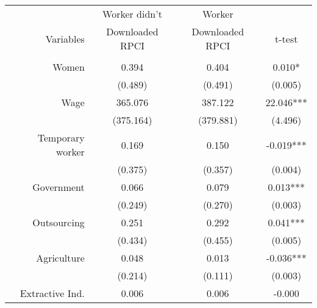 \begin{tabular}{r|rrr}
\toprule
\toprule
\multicolumn{1}{p{12.085em}|}{} & \multicolumn{1}{c}{Worker didn't} & \multicolumn{1}{c}{Worker} &  \\
\multicolumn{1}{p{12.085em}|}{Variables} & \multicolumn{1}{c}{Downloaded RPCI} & \multicolumn{1}{c}{Downloaded RPCI} & \multicolumn{1}{c}{t-test} \\
\midrule
\multicolumn{1}{p{12.085em}|}{} &                 &                 &  \\
\multicolumn{1}{p{12.085em}|}{Women} & \multicolumn{1}{c}{0.394} & \multicolumn{1}{c}{0.404} & \multicolumn{1}{c}{0.010*} \\
\multicolumn{1}{p{12.085em}|}{} & \multicolumn{1}{c}{(0.489)} & \multicolumn{1}{c}{(0.491)} & \multicolumn{1}{c}{(0.005)} \\
\multicolumn{1}{p{12.085em}|}{Wage} & \multicolumn{1}{c}{365.076} & \multicolumn{1}{c}{387.122} & \multicolumn{1}{c}{22.046***} \\
                & \multicolumn{1}{c}{(375.164)} & \multicolumn{1}{c}{(379.881)} & \multicolumn{1}{c}{(4.496)} \\
\multicolumn{1}{p{12.085em}|}{Temporary worker} & \multicolumn{1}{c}{0.169} & \multicolumn{1}{c}{0.150} & \multicolumn{1}{c}{-0.019***} \\
\multicolumn{1}{p{12.085em}|}{} & \multicolumn{1}{c}{(0.375)} & \multicolumn{1}{c}{(0.357)} & \multicolumn{1}{c}{(0.004)} \\
\multicolumn{1}{p{12.085em}|}{Government} & \multicolumn{1}{c}{0.066} & \multicolumn{1}{c}{0.079} & \multicolumn{1}{c}{0.013***} \\
\multicolumn{1}{p{12.085em}|}{} & \multicolumn{1}{c}{(0.249)} & \multicolumn{1}{c}{(0.270)} & \multicolumn{1}{c}{(0.003)} \\
\multicolumn{1}{p{12.085em}|}{Outsourcing} & \multicolumn{1}{c}{0.251} & \multicolumn{1}{c}{0.292} & \multicolumn{1}{c}{0.041***} \\
                & \multicolumn{1}{c}{(0.434)} & \multicolumn{1}{c}{(0.455)} & \multicolumn{1}{c}{(0.005)} \\
\multicolumn{1}{p{12.085em}|}{Agriculture} & \multicolumn{1}{c}{0.048} & \multicolumn{1}{c}{0.013} & \multicolumn{1}{c}{-0.036***} \\
\multicolumn{1}{p{12.085em}|}{} & \multicolumn{1}{c}{(0.214)} & \multicolumn{1}{c}{(0.111)} & \multicolumn{1}{c}{(0.003)} \\
\multicolumn{1}{p{12.085em}|}{Extractive Ind.} & \multicolumn{1}{c}{0.006} & \multicolumn{1}{c}{0.006} & \multicolumn{1}{c}{-0.000} \\

\end{tabular}
